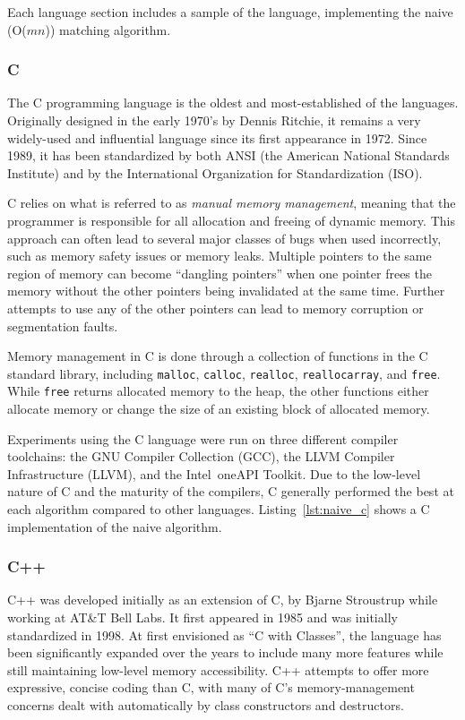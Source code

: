 Each language section includes a sample of the language, implementing the naive (O($mn$)) matching algorithm.

\subsubsection{C}

The C programming language is the oldest and most-established of the languages. Originally designed in the early 1970's by Dennis Ritchie, it remains a very widely-used and influential language since its first appearance in 1972. Since 1989, it has been standardized by both ANSI (the American National Standards Institute) and by the International Organization for Standardization (ISO).

C relies on what is referred to as \textit{manual memory management}, meaning that the programmer is responsible for all allocation and freeing of dynamic memory. This approach can often lead to several major classes of bugs when used incorrectly, such as memory safety issues or memory leaks. Multiple pointers to the same region of memory can become ``dangling pointers'' when one pointer frees the memory without the other pointers being invalidated at the same time. Further attempts to use any of the other pointers can lead to memory corruption or segmentation faults.

Memory management in C is done through a collection of functions in the C standard library, including \texttt{malloc}, \texttt{calloc}, \texttt{realloc}, \texttt{reallocarray}, and \texttt{free}. While \texttt{free} returns allocated memory to the heap, the other functions either allocate memory or change the size of an existing block of allocated memory.

Experiments using the C language were run on three different compiler toolchains: the GNU Compiler Collection (GCC), the LLVM Compiler Infrastructure (LLVM), and the Intel\textregistered~oneAPI Toolkit. Due to the low-level nature of C and the maturity of the compilers, C generally performed the best at each algorithm compared to other languages. Listing~\ref{lst:naive_c} shows a C implementation of the naive algorithm.



\subsubsection{C++}

C++ was developed initially as an extension of C, by Bjarne Stroustrup while working at AT\&T Bell Labs. It first appeared in 1985 and was initially standardized in 1998. At first envisioned as ``C with Classes'', the language has been significantly expanded over the years to include many more features while still maintaining low-level memory accessibility. C++ attempts to offer more expressive, concise coding than C, with many of C's memory-management concerns dealt with automatically by class constructors and destructors.

